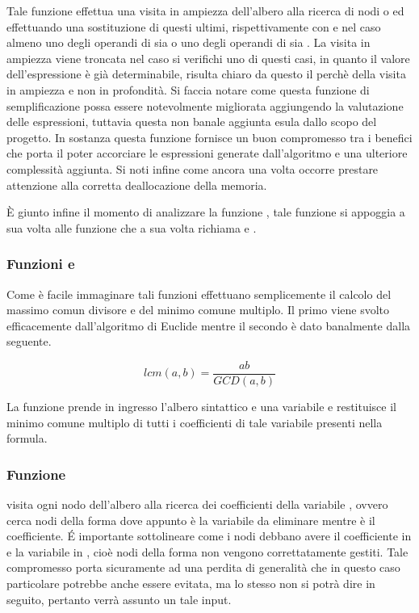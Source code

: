 \documentclass[11pt,letterpaper,twoside]{article}
\begin{document}
Tale funzione effettua una visita in ampiezza dell'albero alla ricerca di nodi
 o  ed effettuando una sostituzione di questi ultimi,
rispettivamente con  e  nel caso almeno uno degli
operandi di  sia  o uno degli operandi di 
sia . La visita in ampiezza viene troncata nel caso si verifichi
uno di questi casi, in quanto il valore dell'espressione è già determinabile,
risulta chiaro da questo il perchè della visita in ampiezza e non in profondità.
Si faccia notare come questa funzione di semplificazione possa essere
notevolmente migliorata aggiungendo la valutazione delle espressioni, tuttavia
questa non banale aggiunta esula dallo scopo del progetto.
In sostanza questa funzione fornisce un buon compromesso tra i benefici che
porta il poter accorciare le espressioni generate dall'algoritmo e una ulteriore
complessità aggiunta. Si noti infine come ancora una volta occorre prestare
attenzione alla corretta deallocazione della memoria.

\`E giunto infine il momento di analizzare la funzione , tale
funzione si appoggia a sua volta alle funzione  che a sua volta
richiama  e .

\subsubsection{Funzioni  e }

Come è facile immaginare tali funzioni effettuano semplicemente il calcolo del
massimo comun divisore e del minimo comune multiplo. Il primo viene svolto
efficacemente dall'algoritmo di Euclide\autocite{euclid} mentre il secondo
è dato banalmente dalla seguente.

$$lcm(a, b) = \frac{a b}{GCD(a, b)}$$

La funzione  prende in ingresso l'albero sintattico e una
variabile e restituisce il minimo comune multiplo di tutti i coefficienti di
tale variabile presenti nella formula.

\subsubsection{Funzione }

 visita ogni nodo dell'albero alla ricerca dei coefficienti della
variabile , ovvero cerca nodi della forma  dove
appunto  è la variabile da eliminare mentre  è il
coefficiente. \'E importante sottolineare come i nodi debbano avere il
coefficiente in  e la variabile in , cioè
nodi della forma  non vengono correttatamente gestiti.
Tale compromesso porta sicuramente ad una perdita di generalità che in questo
caso particolare potrebbe anche essere evitata, ma lo stesso non si potrà dire
in seguito, pertanto verrà assunto un tale input.
\end{document}
